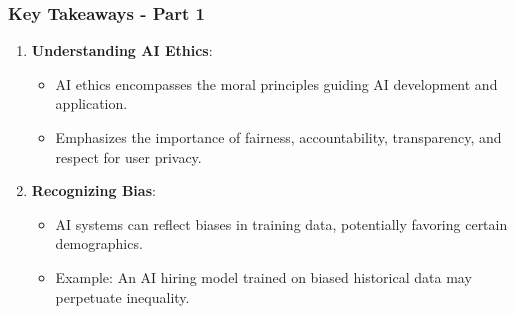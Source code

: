 \documentclass[aspectratio=169]{beamer}
\begin{document}
\begin{frame}[fragile]
    \frametitle{Key Takeaways - Part 1}
    \begin{enumerate}
        \item \textbf{Understanding AI Ethics}:
        \begin{itemize}
            \item AI ethics encompasses the moral principles guiding AI development and application.
            \item Emphasizes the importance of fairness, accountability, transparency, and respect for user privacy.
        \end{itemize}
        
        \item \textbf{Recognizing Bias}:
        \begin{itemize}
            \item AI systems can reflect biases in training data, potentially favoring certain demographics.
            \item Example: An AI hiring model trained on biased historical data may perpetuate inequality.
        \end{itemize}
    \end{enumerate}
\end{frame}
\end{document}
